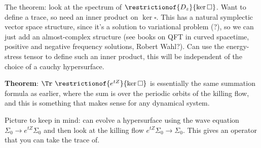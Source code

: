 The theorem: look at the spectrum of
\(\restrictionof{D_z}{\ker\square}\). Want to define a trace, so need an
inner product on \(\ker\square\). This has a natural symplectic vector
space structure, since it's a solution to variational problem (?), so we
can just add an almost-complex structure (see books on QFT in curved
spacetime, positive and negative frequency solutions, Robert Wahl?). Can
use the energy-stress tensor to define such an inner product, this will
be independent of the choice of a cauchy hypersurface.

\textbf{Theorem}: \(\Tr ~\restrictionof{e^{tZ}}{\ker \square}\) is
essentially the same summation formula as earlier, where the sum is over
the periodic orbits of the killing flow, and this is something that
makes sense for any dynamical system.

Picture to keep in mind: can evolve a hypersurface using the wave
equation \(\Sigma_0 \to e^{tZ}\Sigma_0\) and then look at the killing
flow \(e^{tZ}\Sigma_0 \to \Sigma_0\). This gives an operator that you
can take the trace of.

\listoftodos




